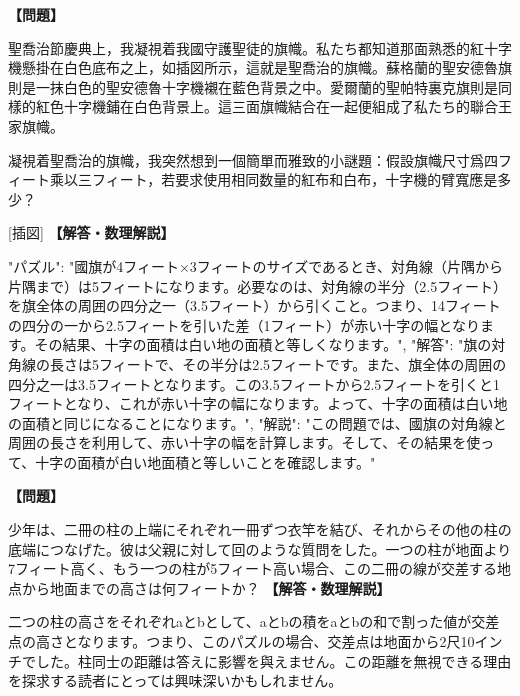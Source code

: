 \documentclass[10pt,a4paper,oneside,openany]{ltjsbook}
\begin{document}
\begin{tcolorbox}[colback=softblue,colframe=primaryblue,title=\textbf{第 185 問：ST. GEORGE'S BANNER.},arc=2mm,boxrule=1pt,breakable]
\textbf{【問題】}\par\vspace{0.3em}
聖喬治節慶典上，我凝視着我國守護聖徒的旗幟。私たち都知道那面熟悉的紅十字機懸掛在白色底布之上，如插図所示，這就是聖喬治的旗幟。蘇格蘭的聖安德魯旗則是一抹白色的聖安德魯十字機襯在藍色背景之中。愛爾蘭的聖帕特裏克旗則是同樣的紅色十字機鋪在白色背景上。這三面旗幟結合在一起便組成了私たち的聯合王家旗幟。

凝視着聖喬治的旗幟，我突然想到一個簡單而雅致的小謎題：假設旗幟尺寸爲四フィート乘以三フィート，若要求使用相同数量的紅布和白布，十字機的臂寬應是多少？

[插図]
\tcblower
\textbf{【解答・数理解説】}\par\vspace{0.3em}
{
"パズル": "國旗が4フィート×3フィートのサイズであるとき、対角線（片隅から片隅まで）は5フィートになります。必要なのは、対角線の半分（2.5フィート）を旗全体の周囲の四分之一（3.5フィート）から引くこと。つまり、14フィートの四分の一から2.5フィートを引いた差（1フィート）が赤い十字の幅となります。その結果、十字の面積は白い地の面積と等しくなります。",
"解答": "旗の対角線の長さは5フィートで、その半分は2.5フィートです。また、旗全体の周囲の四分之一は3.5フィートとなります。この3.5フィートから2.5フィートを引くと1フィートとなり、これが赤い十字の幅になります。よって、十字の面積は白い地の面積と同じになることになります。",
"解説": "この問題では、國旗の対角線と周囲の長さを利用して、赤い十字の幅を計算します。そして、その結果を使って、十字の面積が白い地面積と等しいことを確認します。"
}
\end{tcolorbox}

\begin{tcolorbox}[colback=softblue,colframe=primaryblue,title=\textbf{第 186 問：衣竿の謎題 （原題: THE CLOTHES LINE PUZZLE.）},arc=2mm,boxrule=1pt,breakable]
\textbf{【問題】}\par\vspace{0.3em}
少年は、二冊の柱の上端にそれぞれ一冊ずつ衣竿を結び、それからその他の柱の底端につなげた。彼は父親に対して回のような質問をした。一つの柱が地面より7フィート高く、もう一つの柱が5フィート高い場合、この二冊の線が交差する地点から地面までの高さは何フィートか？
\tcblower
\textbf{【解答・数理解説】}\par\vspace{0.3em}
二つの柱の高さをそれぞれaとbとして、aとbの積をaとbの和で割った値が交差点の高さとなります。つまり、このパズルの場合、交差点は地面から2尺10インチでした。柱同士の距離は答えに影響を與えません。この距離を無視できる理由を探求する読者にとっては興味深いかもしれません。
\end{tcolorbox}
\end{document}
